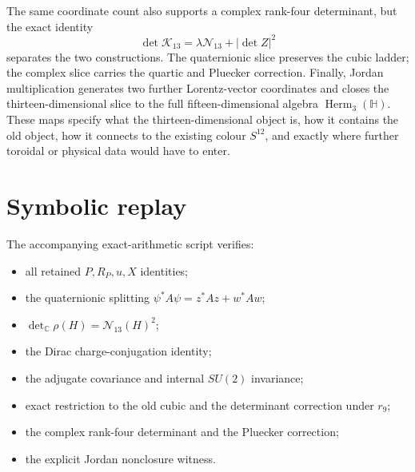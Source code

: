 \documentclass[11pt]{article}
\theoremstyle{definition}
\theoremstyle{remark}
\newcommand{\C}{\mathbb C}
\newcommand{\Hh}{\mathbb H}
\newcommand{\Herm}{\operatorname{Herm}}
\newcommand{\cN}{\mathcal N}
\newcommand{\cK}{\mathcal K}
\begin{document}
The same coordinate count also supports a complex rank-four determinant, but the exact identity
\[
 \det\cK_{13}=\lambda\cN_{13}+|\det Z|^2
\]
separates the two constructions.  The quaternionic slice preserves the cubic ladder; the complex slice carries the quartic and Pluecker correction.  Finally, Jordan multiplication generates two further Lorentz-vector coordinates and closes the thirteen-dimensional slice to the full fifteen-dimensional algebra $\Herm_3(\Hh)$.  These maps specify what the thirteen-dimensional object is, how it contains the old object, how it connects to the existing colour $S^{12}$, and exactly where further toroidal or physical data would have to enter.

\appendix
\section{Symbolic replay}

The accompanying exact-arithmetic script verifies:
\begin{itemize}
\item all retained $P,R_P,u,X$ identities;
\item the quaternionic splitting $\psi^*A\psi=z^*Az+w^*Aw$;
\item $\det_{\C}\rho(H)=\cN_{13}(H)^2$;
\item the Dirac charge-conjugation identity;
\item the adjugate covariance and internal $SU(2)$ invariance;
\item exact restriction to the old cubic and the determinant correction under $r_9$;
\item the complex rank-four determinant and the Pluecker correction;
\item the explicit Jordan nonclosure witness.
\end{itemize}
\end{document}
